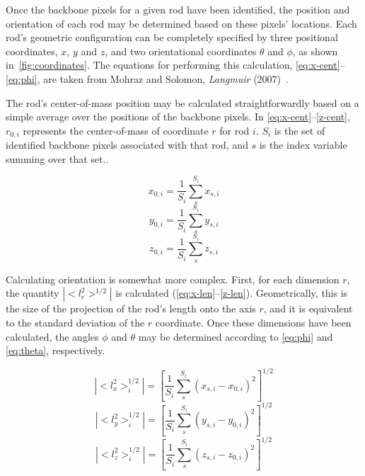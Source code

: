 
Once the backbone pixels for a given rod have been identified, the position and orientation of each rod may
be determined based on these pixels' locations.  Each rod's geometric configuration can be
completely specified by three positional coordinates, $x$, $y$ and $z$, and two
orientational coordinates $\theta$ and $\phi$, as shown in~\ref{fig:coordinates}.
The equations for performing this calculation,
\ref{eq:x-cent}--\ref{eq:phi}, are taken from 
Mohraz and Solomon, \textit{Langmuir} (2007)~\cite{solomon-rods}.

The rod's center-of-mass position may be calculated
straightforwardly based on a simple average over the positions of the backbone pixels.  In 
\ref{eq:x-cent}--\ref{z-cent}, $r_{0,i}$ represents the center-of-mass of coordinate $r$ for 
rod $i$.  $S_i$ is the set of identified backbone pixels associated with that rod, and $s$ is the index
variable summing over that set..

\begin{equation}
\label{eq:x-cent}
x_{0,i} = \frac{1}{S_i} \sum_{s}^{S_i} x_{s,i}
\end{equation}
\begin{equation}
\label{eq:y-cent}
y_{0,i} = \frac{1}{S_i} \sum_{s}^{S_i} y_{s,i}
\end{equation}
\begin{equation}
\label{eq:z-cent}
z_{0,i} = \frac{1}{S_i} \sum_{s}^{S_i} z_{s,i} 
\end{equation}

Calculating orientation is somewhat more complex.  First, for each dimension $r$, the quantity
$|<l_r^2>^{1/2}|$ is calculated (\ref{eq:x-len}--\ref{z-len}). 
Geometrically, this is the size of the projection of the rod's length
onto the axis $r$, and it is equivalent to the standard deviation of the $r$ coordinate.
Once these dimensions have been calculated, the angles $\phi$ and $\theta$ may be 
determined according to \ref{eq:phi} and \ref{eq:theta}, respectively.

\begin{equation}
\label{eq:x-len}
|<l_x^2>_i^{1/2}| = \left[\frac{1}{S_i} \sum_s^{S_i} (x_{s,i} - x_{0,i} )^2 \right]^{1/2}
\end{equation}
\begin{equation}
\label{eq:y-len}
|<l_y^2>_i^{1/2}| = \left[\frac{1}{S_i} \sum_s^{S_i} (y_{s,i} - y_{0,i} )^2 \right]^{1/2}
\end{equation}
\begin{equation}
\label{eq:z-len}
|<l_z^2>_i^{1/2}| = \left[\frac{1}{S_i} \sum_s^{S_i} (z_{s,i} - z_{0,i} )^2 \right]^{1/2}
\end{equation}

